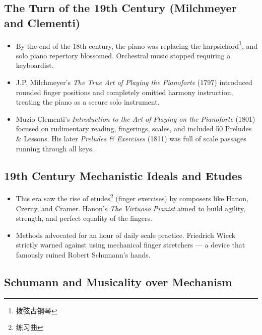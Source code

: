 \documentclass[math,code]{amznotes}
\theoremstyle{remark}
\begin{document}
\subsection{The Turn of the 19th Century (Milchmeyer and Clementi)}

\begin{itemize}
    \item By the end of the 18th century, the piano was replacing the harpsichord\footnote{拨弦古钢琴}, and solo piano repertory blossomed. Orchestral music stopped requiring a keyboardist.
    \item J.P. Milchmeyer's \textit{The True Art of Playing the Pianoforte} (1797) introduced rounded finger positions and completely omitted harmony instruction, treating the piano as a secure solo instrument.
    \item Muzio Clementi's \textit{Introduction to the Art of Playing on the Pianoforte} (1801) focused on rudimentary reading, fingerings, scales, and included 50 Preludes \& Lessons. His later \textit{Preludes \& Exercises} (1811) was full of scale passages running through all keys.
\end{itemize}

\subsection{19th Century Mechanistic Ideals and Etudes}

\begin{itemize}
    \item This era saw the rise of etudes\footnote{练习曲} (finger exercises) by composers like Hanon, Czerny, and Cramer. Hanon's \textit{The Virtuoso Pianist} aimed to build agility, strength, and perfect equality of the fingers.
    \item Methods advocated for an hour of daily scale practice. Friedrich Wieck strictly warned against using mechanical finger stretchers --- a device that famously ruined Robert Schumann's hands.
\end{itemize}


\subsection{Schumann and Musicality over Mechanism}
\end{document}
